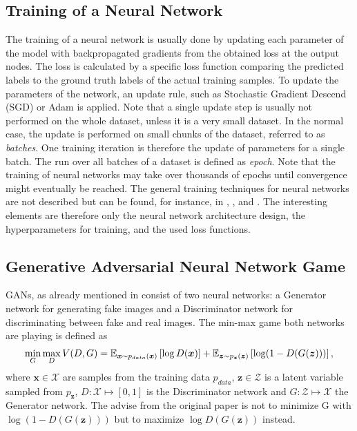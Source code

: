 
\subsection{Training of a Neural Network}
The training of a neural network is usually done by updating each parameter of the model with backpropagated gradients from the obtained loss at the output nodes.
The loss is calculated by a specific loss function comparing the predicted labels to the ground truth labels of the actual training samples.
To update the parameters of the network, an update rule, such as Stochastic Gradient Descend (SGD) or Adam \cite{Kingma2015} is applied.
Note that a single update step is usually not performed on the whole dataset, unless it is a very small dataset.
In the normal case, the update is performed on small chunks of the dataset, referred to as \emph{batches}.
One training iteration is therefore the update of parameters for a single batch.
The run over all batches of a dataset is defined as \emph{epoch}.
Note that the training of neural networks may take over thousands of epochs until convergence might eventually be reached.
The general training techniques for neural networks are not described but can be found, for instance, in \cite{LeCun2006}, \cite{Goodfellow2016}, and \cite{DeepLearning}.
The interesting elements are therefore only the neural network architecture design, the hyperparameters for training, and the used loss functions.



\subsection{Generative Adversarial Neural Network Game}\label{sec:nn_theory_gan}
GANs, as already mentioned in  consist of two neural networks: a Generator network for generating fake images and a Discriminator network for discriminating between fake and real images.
The min-max game both networks are playing is defined as
\begin{equation}\label{eq:nn_theory_gan}
  \underset{G}{\min} \, \underset{D}{\max} \, V(D, G) = \mathbb{E}_{\bm{x} \sim p_{data}(\bm{x})}\left[ \log D(\bm{x}) \right] + 
    \mathbb{E}_{\bm{z} \sim p_{\bm{z}}(\bm{z})}\left[ \log (1 - D(G(\bm{z}))) \right],
\end{equation}
where $\bm{x} \in \mathcal{X}$ are samples from the training data $p_{data}$, $\bm{z} \in \mathcal{Z}$ is a latent variable sampled from $p_{\bm{z}}$, $D: \mathcal{X} \mapsto [0, 1]$ is the Discriminator network and $G: \mathcal{Z} \mapsto \mathcal{X}$ the Generator network.
The advise from the original paper is not to minimize G with $\log (1 - D(G(\bm{z})))$ but to maximize $\log D(G(\bm{z}))$ instead.